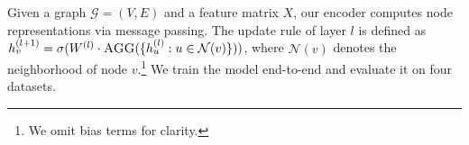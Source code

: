Given a graph $\mathcal{G}=(V,E)$ and a feature matrix $X$, our encoder computes node representations via message passing. The update rule of layer $l$ is defined as $h_v^{(l+1)} = \sigma(W^{(l)} \cdot \textsc{AGG}(\{h_u^{(l)} : u \in \mathcal{N}(v)\}))$, where $\mathcal{N}(v)$ denotes the neighborhood of node $v$.\footnote{We omit bias terms for clarity.} We train the model end-to-end and evaluate it on four datasets.
